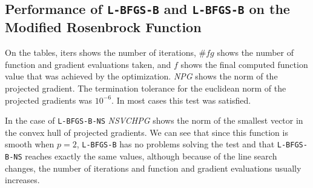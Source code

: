 \subsection{Performance of \texttt{L-BFGS-B} and \texttt{L-BFGS-B} on the Modified Rosenbrock Function}

On the tables, iters shows the number of iterations, $\#fg$ shows the number of function and gradient evaluations taken, and $f$ shows the final computed function value that was achieved by the optimization. \emph{NPG} shows the norm of the projected gradient. The termination tolerance for the euclidean norm of the projected gradients was $10^{-6}$. In most cases this test was satisfied.

In the case of \texttt{L-BFGS-B-NS} \emph{NSVCHPG} shows the norm of the smallest vector in the convex hull of projected gradients. We can see that since this function is smooth when $p = 2$, \texttt{L-BFGS-B} has no problems solving the test and that \texttt{L-BFGS-B-NS} reaches exactly the same values, although because of the line search changes, the number of iterations and function and gradient evaluations usually increases.

